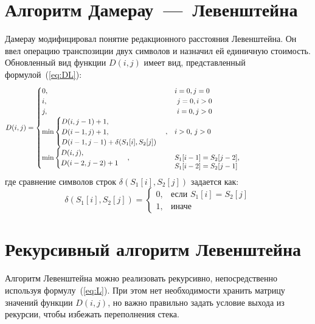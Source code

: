 \section{Алгоритм Дамерау~---~Левенштейна}
Дамерау модифицировал понятие редакционного расстояния Левенштейна. Он ввел операцию транспозиции двух символов и назначил ей единичную стоимость. Обновленный вид функции $D(i, j)$ имеет вид, представленный формулой~(\ref{eq:DL}): 
\begin{equation}
	\label{eq:DL}
	D(i, j) =
\begin{cases}
    0, & \text{} i = 0, j = 0 \\
    i, & \text{ } j = 0, i > 0 \\
    j, & \text{ } i = 0, j > 0 \\
    \min \begin{cases}
        D(i, j - 1) + 1, \\
        D(i - 1, j) + 1, \\
        D(i - 1, j - 1) + \delta(S_1[i],
     S_2[j])
    \end{cases}, & \parbox[t]{.55\linewidth}{\raggedright  $i > 0$, $j > 0$} \\
    \min \begin{cases}
        D(i, j), \\
        D(i - 2, j - 2) + 1
    \end{cases}, & \parbox[t]{.55\linewidth}{\raggedright  $S_1[i - 1] = S_2[j - 2]$,\\
        $S_1[i - 2] = S_2[j - 1]$}
\end{cases}
\end{equation}
где сравнение символов строк $\delta(S_1[i], S_2[j])$ задается как:
\begin{equation}
	\label{eq:delta}
	\delta(S_1[i], S_2[j]) = \begin{cases}
		0, & \text{если } S_1[i] = S_2[j] \\
		1, & \text{иначе}
	\end{cases}
\end{equation}

\section{Рекурсивный алгоритм Левенштейна}
Алгоритм Левенштейна можно реализовать рекурсивно, непосредственно используя формулу~(\ref{eq:L}). При этом нет необходимости хранить матрицу значений функции $D(i,j)$, но важно правильно задать условие выхода из рекурсии, чтобы избежать переполнения стека.

